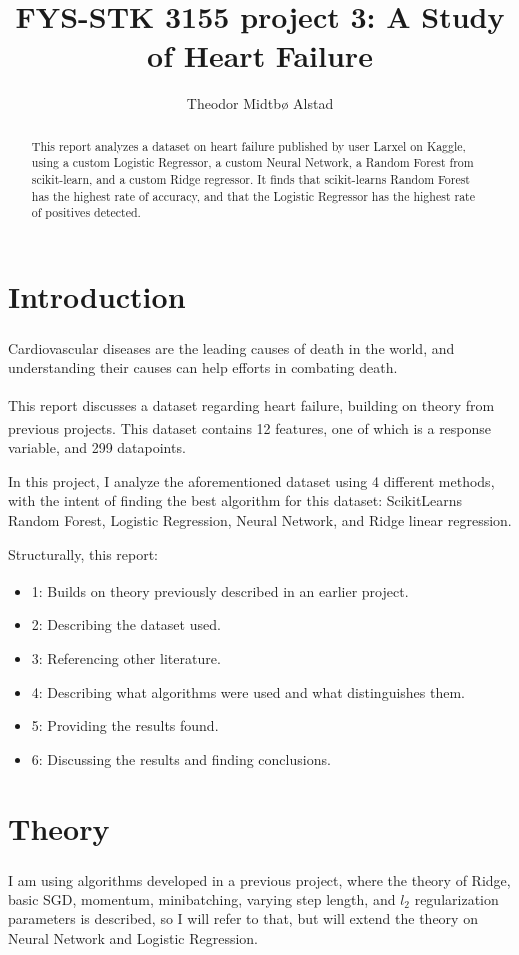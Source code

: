 \documentclass[a4paper, UKenglish]{article}
\newcommand{\0}{\mathbf{0}}
\newcommand{\1}{\mathbf{1}}
\newcommand{\citesup}[1]{\textsuperscript{\cite{#1}}}
\begin{document}
\title{FYS-STK 3155 project 3: A Study of Heart Failure}
\author{Theodor Midtbø Alstad}
\maketitle

\begin{abstract}
This report analyzes a dataset on heart failure published by user Larxel on Kaggle, using a custom Logistic Regressor, a custom Neural Network, a Random Forest from scikit-learn, and a custom Ridge regressor. It finds that scikit-learns Random Forest has the highest rate of accuracy, and that the Logistic Regressor has the highest rate of positives detected.
\end{abstract}




\section{Introduction}
Cardiovascular diseases are the leading causes of death in the world\citesup{top10death}, and understanding their causes can help efforts in combating death. 

This report discusses a dataset regarding heart failure\citesup{dataset}, building on theory from previous projects\citesup{project_1}\citesup{project_2}. This dataset contains 12 features, one of which is a response variable, and 299 datapoints.

In this project, I analyze the aforementioned dataset using 4 different methods, with the intent of finding the best algorithm for this dataset: ScikitLearns Random Forest, Logistic Regression, Neural Network, and Ridge linear regression.

Structurally, this report:
\begin{itemize}
\item1: Builds on theory previously described in an earlier project\citesup{project_2}.
\item2: Describing the dataset used.
\item3: Referencing other literature.
\item4: Describing what algorithms were used and what distinguishes them.
\item5: Providing the results found.
\item6: Discussing the results and finding conclusions.
\end{itemize} 

\section{Theory}
I am using algorithms developed in a previous project\citesup{project_2}, where the theory of Ridge, basic SGD, momentum, minibatching, varying step length, and $l_2$ regularization parameters is described, so I will refer to that, but will extend the theory on Neural Network and Logistic Regression.
\end{document}
